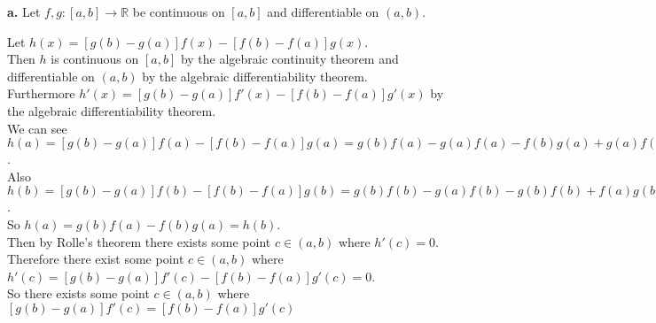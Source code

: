 \documentclass{article}
\begin{document}
{\Large\textbf{a.}} Let $f, g: [a, b]\rightarrow\mathbb{R}$ be continuous on $[a, b]$ and differentiable on $(a, b)$.
\begin{center}
    \doublespacing
    Let $h(x) = [g(b) - g(a)] f(x) - [f(b) - f(a)] g(x)$.
    \\Then $h$ is continuous on $[a, b]$ by the algebraic continuity theorem and differentiable on $(a, b)$ by the algebraic differentiability theorem.
    \\Furthermore $h'(x) = [g(b) - g(a)] f'(x) - [f(b) - f(a)] g'(x)$ by the algebraic differentiability theorem.
    \\We can see $h(a) = [g(b) - g(a)] f(a) - [f(b) - f(a)] g(a) = g(b) f(a) - g(a) f(a) - f(b) g(a) + g(a) f(a) = g(b) f(a) - f(b) g(a)$.
    \\Also $h(b) = [g(b) - g(a)] f(b) - [f(b) - f(a)] g(b) = g(b) f(b) - g(a) f(b) - g(b) f(b) + f(a) g(b) = g(b) f(a) - f(b) g(a)$.
    \\So $h(a) = g(b) f(a) - f(b) g(a) = h(b)$.
    \\Then by Rolle's theorem there exists some point $c\in (a, b)$ where $h'(c) = 0$.
    \\Therefore there exist some point $c\in (a, b)$ where $h'(c) = [g(b) - g(a)] f'(c) - [f(b) - f(a)] g'(c) = 0$.
    \\So there exists some point $c\in (a, b)$ where $[g(b) - g(a)] f'(c) = [f(b) - f(a)] g'(c)$ \qedsymbol
\end{center}


\newpage
\end{document}
